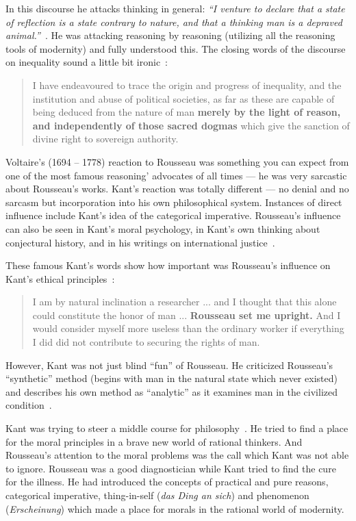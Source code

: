 \documentclass{article}
\begin{document}
In this discourse he attacks thinking in general: \textit{``I venture to declare that a state of reflection is a state contrary to nature, and that a thinking man is a depraved animal.''}~\cite{discourse2}. He was attacking reasoning by reasoning (utilizing all the reasoning tools of modernity) and fully understood this. The closing words of the discourse on inequality sound a little bit ironic~\cite{discourse2}:

\begin{quote}
I have endeavoured to trace
the origin and progress of inequality, and the institution and abuse of political societies, as far as these are capable of being deduced from the nature of man
\textbf{merely by the light of reason, and independently of those sacred dogmas} which give the sanction of divine right to sovereign authority.
\end{quote}

Voltaire's (1694 -- 1778) reaction to Rousseau was something you can expect from one of the most famous reasoning' advocates of all times --- he was very sarcastic about Rousseau's works.
Kant's reaction was totally different --- no denial and no sarcasm but incorporation into his own philosophical system. Instances of direct influence include Kant's idea of
the categorical imperative. Rousseau's influence can also be seen in Kant's moral psychology, in Kant's own thinking about conjectural history, and in his writings on international
justice~\cite{stanford}.

These famous Kant's words show how important was Rousseau's influence on Kant's ethical principles~\cite{propagator}:
\begin{quote}
I am by natural inclination a researcher ... and I thought that this alone could constitute the honor of man ... \textbf{Rousseau set me upright.} And I would consider myself more useless than
the ordinary worker if everything I did did not contribute to securing the rights of man.
\end{quote}

However, Kant was not just blind ``fun'' of Rousseau. He criticized Rousseau's ``synthetic'' method (begins with man in the natural state which never existed)
and describes his own method as ``analytic'' as it examines man in the civilized condition~\cite{clewis}.

Kant was trying to steer a middle course for philosophy~\cite{Roth}. He tried to find a place for the moral principles in a brave new world of rational thinkers. And Rousseau's attention
to the moral problems was the call which Kant was not able to ignore. Rousseau was a good diagnostician while Kant tried to find the cure for the illness. He had introduced the concepts
of practical and pure reasons, categorical imperative, thing-in-self (\textsl{das Ding an sich}) and phenomenon (\textsl{Erscheinung}) which made a place for morals in the rational world of modernity.


\end{document}
